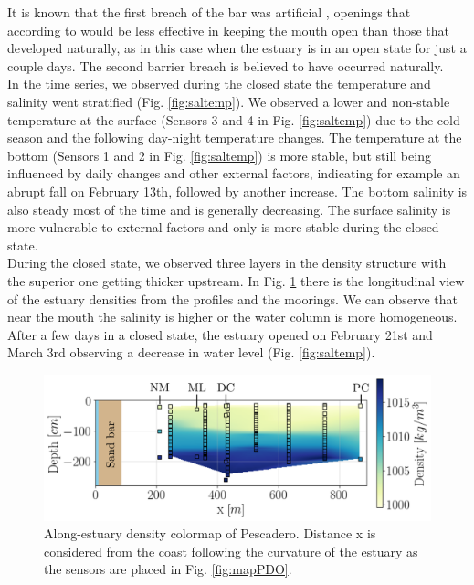 \documentclass[tesis.tex]{subfiles}
\begin{document}
It is known that the first breach of the bar was artificial \citep{Williams2014}, openings that according to \cite{Behrens2013} would be less effective in keeping the mouth open than those that developed naturally, as in this case when the estuary is in an open state for just a couple days. The second barrier breach is believed to have occurred naturally. \\

In the time series, we observed during the closed state the temperature and salinity went stratified (Fig. \ref{fig:saltemp}). We observed a lower and non-stable temperature at the surface (Sensors 3 and 4 in Fig. \ref{fig:saltemp}) due to the cold season and the following day-night temperature changes. The temperature at the bottom (Sensors 1 and 2 in Fig. \ref{fig:saltemp}) is more stable, but still being influenced by daily changes and other external factors, indicating for example an abrupt fall on February 13th, followed by another increase. The bottom salinity is also steady most of the time and is generally decreasing. The surface salinity is more vulnerable to external factors and only is more stable during the closed state. \\ 

During the closed state, we observed three layers in the density structure with the superior one getting thicker upstream. In Fig. \ref{fig:perfiles1} there is the longitudinal view of the estuary densities from the profiles and the moorings. We can observe that near the mouth the salinity is higher or the water column is more homogeneous. After a few days in a closed state, the estuary opened on February 21st and March 3rd observing a decrease in water level (Fig. \ref{fig:saltemp}). \\

\begin{figure}[h!]
    \centering
    \includegraphics[scale=0.6]{Imagenes/vista_long2.png}
    \caption{Along-estuary density colormap of Pescadero. Distance x is considered from the coast following the curvature of the estuary as the sensors are placed in Fig. \ref{fig:mapPDO}. }
    \label{fig:perfiles1}
\end{figure}
\end{document}
